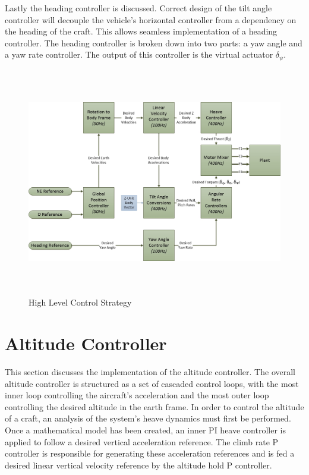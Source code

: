 	 Lastly the heading controller is discussed. Correct design of the tilt angle controller will decouple the vehicle's horizontal controller from a dependency on the heading of the craft. This allows seamless implementation of a heading controller. The heading controller is broken down into two parts: a yaw angle and a yaw rate controller. The output of this controller is the virtual actuator $\delta_\psi$.
	 
	 \begin{figure}[H]
	 	\centering
	 	\includegraphics[height = 10cm]{../References/Diagrams/HighLevel.jpg}
	 	\caption{High Level Control Strategy}
	 	\label{IM_ControlStrategy}
	 \end{figure}
	 
	 \section{Altitude Controller}
	 This section discusses the implementation of the altitude controller. The overall altitude controller is structured as a set of cascaded control loops, with the most inner loop controlling the aircraft's acceleration and the most outer loop controlling the desired altitude in the earth frame. In order to control the altitude of a craft, an analysis of the system's heave dynamics must first be performed. Once a mathematical model has been created, an inner PI heave controller is applied to follow a desired vertical acceleration reference. The climb rate P controller is responsible for generating these acceleration references and is fed a desired linear vertical velocity reference by the altitude hold P controller. 
	 
